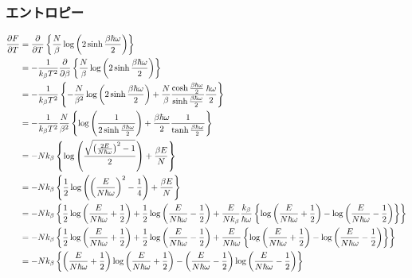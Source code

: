 \documentclass[dvipdfmx, 11pt, a4paper]{jsarticle}
\theoremstyle{definition}
\begin{document}
\subsubsection{エントロピー}
    \begin{align}
        \frac{\partial F}{\partial T} &= \frac{\partial }{\partial T} \left\{ \frac{N}{\beta} \log \left( 2\sinh \frac{\beta \hbar \omega}{2} \right)  \right\} \notag \\
        &= -\frac{1}{k_\beta T^2}\frac{\partial }{\partial \beta} \left\{ \frac{N}{\beta} \log \left( 2\sinh \frac{\beta \hbar \omega}{2} \right)  \right\} \notag \\
        &= -\frac{1}{k_\beta T^2} \left\{ -\frac{N}{\beta^2} \log \left( 2\sinh \frac{\beta \hbar \omega}{2} \right) + \frac{N}{\beta} \frac{\cosh \frac{\beta \hbar \omega}{2}}{\sinh \frac{\beta \hbar \omega}{2} } \frac{\hbar \omega}{2} \right\} \notag \\
        &= -\frac{1}{k_\beta T^2} \frac{N}{\beta^2} \left\{ \log \left( \frac{1}{2\sinh \frac{\beta \hbar \omega}{2}} \right) + \frac{\beta \hbar \omega}{2} \frac{1}{\tanh \frac{\beta \hbar \omega}{2}} \right\}  \\
        &= -Nk_\beta \left\{ \log \left( \frac{\sqrt{ \left( \frac{2E}{N\hbar \omega}\right)^2 - 1}}{2}  \right) + \frac{\beta E}{N}  \right\} \notag \\
        &= -Nk_\beta \left\{ \frac{1}{2} \log \left( \left( \frac{E}{N\hbar \omega}\right)^2 - \frac{1}{4}  \right) + \frac{\beta E}{N} \right\} \notag \\
        &= -Nk_\beta \left\{ \frac{1}{2} \log \left( \frac{E}{N\hbar \omega} + \frac{1}{2}  \right) + \frac{1}{2} \log \left( \frac{E}{N\hbar \omega} - \frac{1}{2}  \right) + \frac{E}{Nk_\beta} \frac{k_\beta}{ \hbar \omega} \left\{ \log \left( \frac{E}{N \hbar \omega} + \frac{1}{2} \right) - \log \left( \frac{E}{N \hbar \omega} - \frac{1}{2} \right) \right\} \right\} \notag \\
        &= -Nk_\beta \left\{ \frac{1}{2} \log \left( \frac{E}{N\hbar \omega} + \frac{1}{2}  \right) + \frac{1}{2} \log \left( \frac{E}{N\hbar \omega} - \frac{1}{2}  \right) + \frac{E}{N\hbar \omega} \left\{ \log \left( \frac{E}{N \hbar \omega} + \frac{1}{2} \right) - \log \left( \frac{E}{N \hbar \omega} - \frac{1}{2} \right) \right\} \right\} \notag \\
        &= -Nk_\beta \left\{ \left( \frac{E}{N\hbar \omega} + \frac{1}{2} \right) \log \left( \frac{E}{N\hbar \omega} + \frac{1}{2} \right) - \left(\frac{E}{N\hbar \omega } -\frac{1}{2} \right)  \log \left( \frac{E}{N\hbar \omega} - \frac{1}{2}  \right) \right\} \notag
    \end{align}
\end{document}
